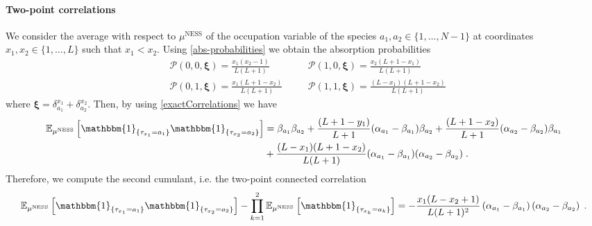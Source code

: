 \documentclass[10pt]{article}
\numberwithin{equation}{section}
\numberwithin{equation}{subsection}
\newcommand{\dt}{\;.}
\begin{document}
\paragraph{Two-point correlations}
We consider the average with respect to $\mu^{\text{NESS}}$ of the occupation variable of the species  $a_{1},a_{2}\in \{1,\ldots,N-1\}$ at coordinates $x_{1},x_{2}\in \{1,\ldots,L\}$ such that $x_{1}< x_{2}$. 
Using \eqref{abs-probabilities} we obtain the absorption probabilities
\begin{equation}
	\begin{split}
	&\mathcal{P}(0,0,\bm{\xi})=\frac{x_{1}(x_{2}-1)}{L(L+1)}\\
	&\mathcal{P}(0,1,\bm{\xi})=\frac{x_{1}(L+1-x_{2})}{L(L+1)}
\end{split}\quad \begin{split}
	&\mathcal{P}(1,0,\bm{\xi})=\frac{x_{2}(L+1-x_{1})}{L(L+1)}\\
	&\mathcal{P}(1,1,\bm{\xi})=\frac{(L-x_{1})(L+1-x_{2})}{L(L+1)}
	\end{split}
\end{equation}
where $\bm{\xi}=\delta_{a_{1}}^{x_{1}}+\delta_{a_{2}}^{x_{2}}$. 
Then, by using \eqref{exactCorrelations} we have 
\begin{equation}
	\begin{split}
	 \mathbb{E}_{\mu^{\text{NESS}}}\left[\mathbbm{1}_{\{\tau_{x_{1}}=a_{1}\}}\mathbbm{1}_{\{\tau_{x_{2}}=a_{2}\}}\right]&=\beta_{a_{1}}\beta_{a_{2}}+\frac{(L+1-y_{1})}{L+1}(\alpha_{a_{1}}-\beta_{a_{1}})\beta_{a_{2}}+\frac{(L+1-x_{2})}{L+1}(\alpha_{a_{2}}-\beta_{a_{2}})\beta_{a_{1}}\\&+\frac{(L-x_{1})(L+1-x_{2})}{L(L+1)}(\alpha_{a_{1}}-\beta_{a_{1}})(\alpha_{a_{2}}-\beta_{a_{2}})\dt
	\end{split}
\end{equation}
Therefore, we compute the second cumulant, i.e. the two-point connected correlation
\begin{equation}\label{two-pts-corr}
	\begin{split}
		 \mathbb{E}_{\mu^{\text{NESS}}}\left[\mathbbm{1}_{\{\tau_{x_{1}}=a_{1}\}}\mathbbm{1}_{\{\tau_{x_{2}}=a_{2}\}}\right]-\prod_{k=1}^{2}\mathbb{E}_{\mu^{\text{NESS}}}\left[\mathbbm{1}_{\{\tau_{x_{k}}=a_{k}\}}\right]=-\frac{x_{1}(L-x_{2}+1)}{L(L+1)^{2}}\left(\alpha_{a_{1}}-\beta_{a_{1}}\right)\left(\alpha_{a_{2}}-\beta_{a_{2}}\right)\dt
	\end{split}
\end{equation}
\end{document}
